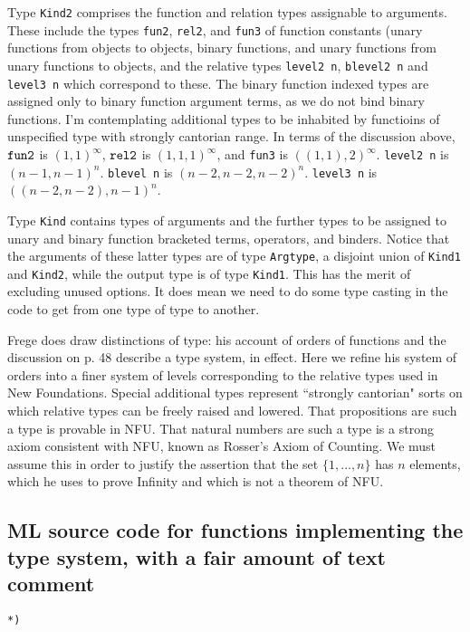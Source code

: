 \documentclass{article}
\begin{document}
{{Type {\tt Kind2} comprises the function and relation types assignable to arguments.  These include the types {\tt fun2}, {\tt rel2}, and {\tt fun3} of function constants (unary functions from objects to objects, binary functions,
and unary functions from unary functions to objects, and the relative types {\tt level2 n}, {\tt blevel2 n} and {\tt level3 n} which correspond to these.  The binary function indexed types are assigned only to
binary function argument terms, as we do not bind binary functions.  I'm contemplating additional types to be inhabited by functioins of unspecified type with strongly cantorian range.
In terms of the discussion above, ${\tt fun2}$ is $(1,1)^{\infty}$, ${\tt rel2}$ is $(1,1,1)^{\infty}$, and {\tt fun3} is $((1,1),2)^{\infty}$.  {\tt level2 n} is $(n-1,n-1)^n$.
{\tt blevel n} is $(n-2,n-2,n-2)^n$.  {\tt level3 n} is $((n-2,n-2),n-1)^n$.  

Type {\tt Kind} contains types of arguments and the further types to be assigned to unary and binary function bracketed terms, operators, and binders.  Notice that the arguments of these latter types are
of type {\tt Argtype}, a disjoint union of {\tt Kind1} and {\tt Kind2}, while the output type is of type {\tt Kind1}.  This has the merit of excluding unused options.  It does mean we need to do some type
casting in the code to get from one type of type to another.

Frege does draw distinctions of type:  his account of orders of functions and the discussion on p. 48 describe a type system, in effect.  Here we refine his system of orders
into a finer system of levels corresponding to the relative types used in New Foundations.  Special additional types represent ``strongly cantorian" sorts on which relative types can be freely raised and lowered.  That propositions are such a type is provable in NFU.  That natural numbers are such a type is a strong axiom consistent with NFU, known as Rosser's Axiom of Counting.  We must assume this in order to justify the assertion that the set $\{1,\ldots,n\}$ has $n$ elements, which he uses to prove Infinity and which is not a theorem of NFU.

\subsection{ML source code for functions implementing the type system, with a fair amount of text comment}

\begin{verbatim}
*)


\end{verbatim}}}
\end{document}
